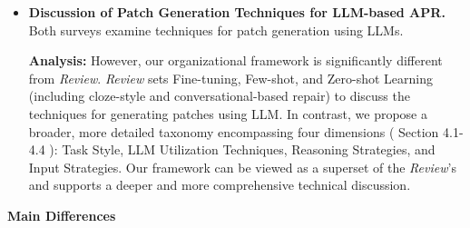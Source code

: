 \documentclass[acmsmall]{acmart}
\begin{document}
\begin{itemize}
		\item \textbf{Discussion of Patch Generation Techniques for LLM-based APR.}
			\newline
			Both surveys examine techniques for patch generation using LLMs.
			\newline

			\textbf{Analysis: }However, our organizational framework is significantly different from
			\textit{Review}. \textit{Review} sets Fine-tuning, Few-shot, and Zero-shot Learning (including
			cloze-style and conversational-based repair) to discuss the techniques for generating
			patches using LLM. In contrast, we propose a broader, more detailed taxonomy encompassing
			four dimensions (
			\color{red}
			Section 4.1-4.4
			\color{black}
			): Task Style, LLM Utilization Techniques, Reasoning Strategies, and Input Strategies.
			Our framework can be viewed as a superset of the \textit{Review}’s and supports a deeper
			and more comprehensive technical discussion.
			\newline
	\end{itemize}

	\textbf{Main Differences}
\end{document}
